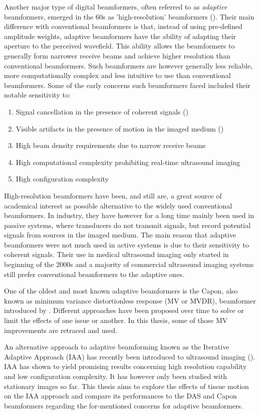 Another major type of digital beamformers, often referred to as \textit{adaptive} beamformers, emerged in the 60s as 'high-resolution' beamformers (\cite{Capon}). Their main difference with conventional beamformers is that, instead of using pre-defined amplitude weights, adaptive beamformers have the ability of adapting their aperture to the perceived wavefield. This ability allows the beamformers to generally form narrower receive beams and achieve higher resolution than conventional beamformers. Such beamformers are however generally less reliable, more computationally complex and less intuitive to use than conventional beamformers.
Some of the early concerns such beamformers faced included their notable sensitivity to:
\begin{enumerate}
    \item Signal cancellation in the presence of coherent signals (\cite{spatial_smoothing})
    \item Visible artifacts in the presence of motion in the imaged medium (\cite{Asen_shift_invariance})
    \item High beam density requirements due to narrow receive beams
    \item High computational complexity prohibiting real-time ultrasound imaging
    \item High configuration complexity
\end{enumerate}
\noindent
High-resolution beamformers have been, and still are, a great source of academical interest as possible alternative to the widely used conventional beamformers. 
In industry, they have however for a long time mainly been used in passive systems, where transducers do not transmit signals, but record potential signals from sources in the imaged medium. The main reason that adaptive beamformers were not much used in active systems is due to their sensitivity to coherent signals.
Their use in medical ultrasound imaging only started in beginning of the 2000s and a majority of commercial ultrasound imaging systems still prefer conventional beamformers to the adaptive ones.

One of the oldest and most known adaptive beamformers is the Capon, also known as minimum variance distortionless response (MV or MVDR), beamformer introduced by \cite{Capon}.
Different approaches have been proposed over time to solve or limit the effects of one issue or another.
In this thesis, some of those MV improvements are retraced and used.

An alternative approach to adaptive beamforming known as the Iterative Adaptive Approach (IAA) has recently been introduced to ultrasound imaging (\cite{Jensen_IAA}).
IAA has shown to yield promising results concerning high resolution capability and low configuration complexity. It has however only been studied with stationary images so far. This thesis aims to explore the effects of tissue motion on the IAA approach and compare its performances to the DAS and Capon beamformers regarding the for-mentioned concerns for adaptive beamformers.

